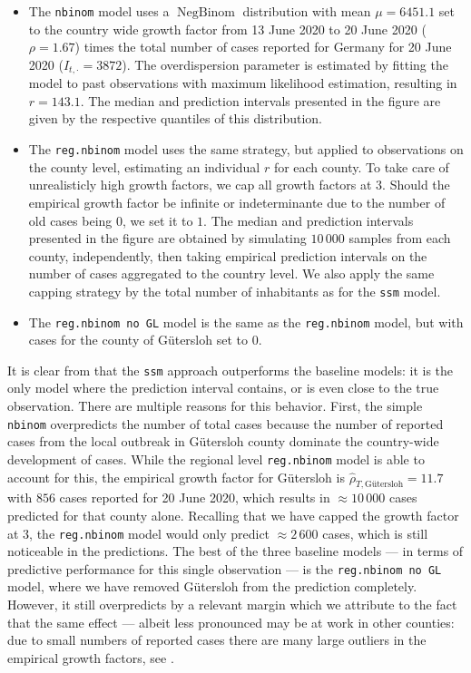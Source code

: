 \begin{itemize}
    \item The \texttt{nbinom} model uses a $ \operatorname{NegBinom}$ distribution with mean $\mu = 6451.1$ set to the country wide growth factor from 13 June 2020 to 20 June 2020 ($\rho = 1.67$) times the total number of cases reported for Germany for 20 June 2020 ($I_{t,\cdot} = 3872$). The overdispersion parameter is estimated by fitting the model to past observations with maximum likelihood estimation, resulting in $r = 143.1$. The median and prediction intervals presented in the figure are given by the respective quantiles of this distribution.
    \item The \texttt{reg.nbinom} model uses the same strategy, but applied to observations on the county level, estimating an individual $r$ for each county. To take care of unrealisticly high growth factors, we cap all growth factors at $3$. Should the empirical growth factor be infinite or indeterminante due to the number of old cases being $0$, we set it to $1$.  The median and prediction intervals presented in the figure are obtained by simulating $10\,000$ samples from each county, independently, then taking empirical prediction intervals on the number of cases aggregated to the country level. We also apply the same capping strategy by the total number of inhabitants as for the \texttt{ssm} model.
    \item The \texttt{reg.nbinom no GL} model is the same as the \texttt{reg.nbinom} model, but with cases for the county of Gütersloh set to $0$. 
\end{itemize}

It is clear from  that the \texttt{ssm} approach outperforms the baseline models: it is the only model where the prediction interval contains, or is even close to the true observation. There are multiple reasons for this behavior. First, the simple \texttt{nbinom} overpredicts the number of total cases because the number of reported cases from the local outbreak in Gütersloh county dominate the country-wide development of cases. While the regional level \texttt{reg.nbinom} model is able to account for this, the empirical growth factor for Gütersloh is $\hat \rho_{T, \text{Gütersloh}} = 11.7$ with $856$ cases reported for 20 June 2020, which results in $\approx 10\,000$ cases predicted for that county alone. Recalling that we have capped the growth factor at $3$, the \texttt{reg.nbinom}  model would only predict $\approx 2\,600$ cases, which is still noticeable in the predictions. 
The best of the three baseline models --- in terms of predictive performance for this single observation --- is the \texttt{reg.nbinom no GL} model, where we have removed Gütersloh from the prediction completely. However, it still overpredicts by a relevant margin which we attribute to the fact that the same effect --- albeit less pronounced may be at work in other counties: due to small numbers of reported cases there are many large outliers in the empirical growth factors, see . 

